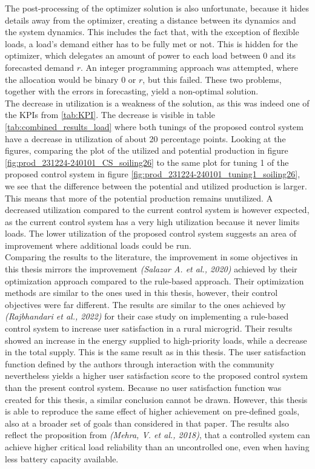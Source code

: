The post-processing of the optimizer solution is also unfortunate, because it hides details away from the optimizer, creating a distance between its dynamics and the system dynamics. This includes the fact that, with the exception of flexible loads, a load's demand either has to be fully met or not. This is hidden for the optimizer, which delegates an amount of power to each load between 0 and its forecasted demand $r$. An integer programming approach was attempted, where the allocation would be binary 0 or $r$, but this failed. These two problems, together with the errors in forecasting, yield a non-optimal solution.\\

The decrease in utilization is a weakness of the solution, as this was indeed one of the KPIs from \ref{tab:KPI}. The decrease is visible in table \ref{tab:combined_results_load} where both tunings of the proposed control system have a decrease in utilization of about 20 percentage points. Looking at the figures, comparing the plot of the utilized and potential production in figure \ref{fig:prod_231224-240101_CS_soiling26} to the same plot for tuning 1 of the proposed control system in figure \ref{fig:prod_231224-240101_tuning1_soiling26}, we see that the difference between the potential and utilized production is larger. This means that more of the potential production remains unutilized. A decreased utilization compared to the current control system is however expected, as the current control system has a very high utilization because it never limits loads. The lower utilization of the proposed control system suggests an area of improvement where additional loads could be run.\\

Comparing the results to the literature, the improvement in some objectives in this thesis mirrors the improvement \textit{(Salazar A. et al., 2020)} achieved by their optimization approach compared to the rule-based approach. Their optimization methods are similar to the ones used in this thesis, however, their control objectives were far different. The results are similar to the ones achieved by \textit{(Rajbhandari et al., 2022)} for their case study on implementing a rule-based control system to increase user satisfaction in a rural microgrid. Their results showed an increase in the energy supplied to high-priority loads, while a decrease in the total supply. This is the same result as in this thesis. The user satisfaction function defined by the authors through interaction with the community nevertheless yields a higher user satisfaction score to the proposed control system than the present control system. Because no user satisfaction function was created for this thesis, a similar conclusion cannot be drawn. However, this thesis is able to reproduce the same effect of higher achievement on pre-defined goals, also at a broader set of goals than considered in that paper. The results also reflect the proposition from \textit{(Mehra, V. et al., 2018)}, that a controlled system can achieve higher critical load reliability than an uncontrolled one, even when having less battery capacity available.\\

